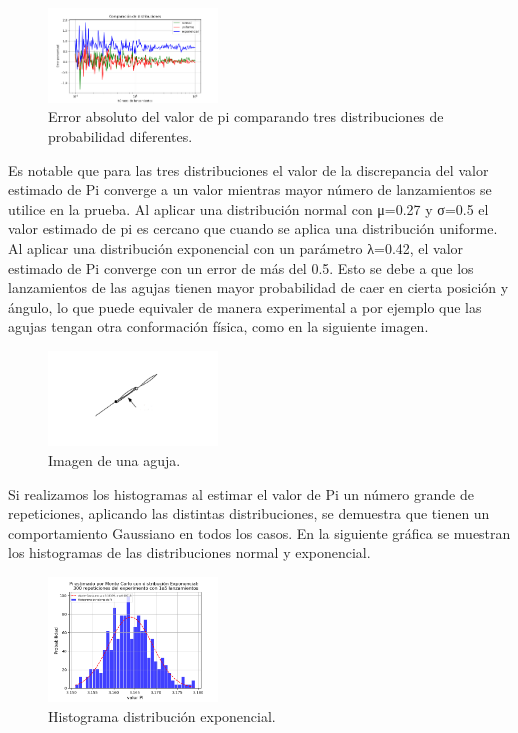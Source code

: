 \documentclass{rbf}
\begin{document}
\begin{figure}[tbp!]
 \centering
  \includegraphics[width=0.4\textwidth]{figures/grafica.png}
	\caption{Error absoluto del valor de pi comparando tres distribuciones de probabilidad diferentes.}
 \label{buff}
\end{figure}
Es notable que para las tres distribuciones el valor de la discrepancia del valor estimado de Pi converge a un valor mientras mayor número de lanzamientos se utilice en la prueba. Al aplicar una distribución normal con μ=0.27 y  σ=0.5 el valor estimado de pi es cercano que cuando se aplica una distribución uniforme. Al aplicar una distribución exponencial con un parámetro λ=0.42, el valor estimado de Pi converge con un error de más del 0.5. Esto se debe a que los lanzamientos de las agujas tienen mayor probabilidad de caer en cierta posición y ángulo, lo que puede equivaler de manera experimental a por ejemplo que las agujas tengan otra conformación física, como en la siguiente imagen.
\begin{figure}[tbp!]
 \centering
  \includegraphics[width=0.4\textwidth]{figures/aguja.png}
	\caption{Imagen de una aguja.\cite{Statistics}}
 \label{buff}
\end{figure}
Si realizamos los histogramas al estimar el valor de Pi un número grande de repeticiones, aplicando las distintas distribuciones, se demuestra que tienen un comportamiento Gaussiano en todos los casos. En la siguiente gráfica se muestran los histogramas de las distribuciones normal y exponencial. 
\begin{figure}[tbp!]
 \centering
  \includegraphics[width=0.4\textwidth]{figures/MCdistExp.png}
	\caption{Histograma distribución exponencial.}
 \label{buff}
\end{figure}
\end{document}
